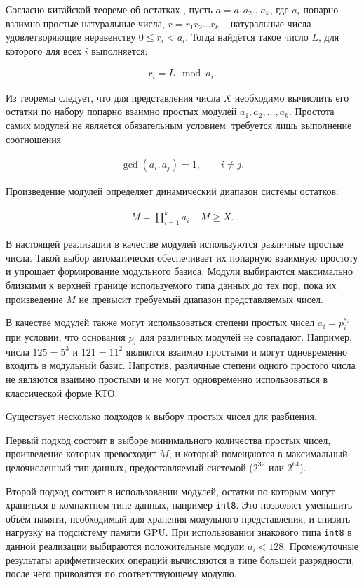 \documentclass{crm-article}
\begin{document}
Согласно китайской теореме об остатках \cite{Cormen2001, Sizyi2008}, пусть $a = a_1 a_2 ... a_k$, где $a_i$ попарно взаимно простые натуральные числа, $r = r_1 r_2 ... r_k$ -- натуральные числа удовлетворяющие неравенству $0 \leq r_i < a_i$. Тогда найдётся такое число $L$, для которого для всех $i$ выполняется:

\begin{gather}
	\label{eq:rem_th}
	r_i=L \mod a_i.
\end{gather}

Из теоремы следует, что для представления числа $X$ необходимо вычислить его остатки по набору попарно взаимно простых модулей $a_1,a_2,\ldots,a_k$. Простота самих модулей не является обязательным условием: требуется лишь выполнение соотношения

\begin{gather}
    \gcd(a_i,a_j)=1,\qquad i\ne j.
\end{gather}

Произведение модулей определяет динамический диапазон системы остатков:

\begin{gather}
	\label{eq:corollary}
	M = \prod\limits_{i=1}^k a_i, ~~~ M \geqslant X.
\end{gather}

В настоящей реализации в качестве модулей используются различные простые числа. Такой выбор автоматически обеспечивает их попарную взаимную простоту и упрощает формирование модульного базиса. Модули выбираются максимально близкими к верхней границе используемого типа данных до тех пор, пока их произведение $M$ не превысит требуемый диапазон представляемых чисел.

В качестве модулей также могут использоваться степени простых чисел $a_i=p_i^{s_i}$ при условии, что основания $p_i$ для различных модулей не совпадают. Например, числа $125=5^3$ и $121=11^2$ являются взаимно простыми и могут одновременно входить в модульный базис. Напротив, различные степени одного простого числа не являются взаимно простыми и не могут одновременно использоваться в классической форме КТО.

Существует несколько подходов к выбору простых чисел для разбиения. 

Первый подход состоит в выборе минимального количества простых чисел, произведение которых превосходит $M$, и который помещаются в максимальный целочисленный тип данных, предоставляемый системой ($2^{32}$ или $2^{64}$). 

Второй подход состоит в использовании модулей, остатки по которым могут храниться в компактном типе данных, например \texttt{int8}. Это позволяет уменьшить объём памяти, необходимый для хранения модульного представления, и снизить нагрузку на подсистему памяти GPU. При использовании знакового типа \texttt{int8} в данной реализации выбираются положительные модули $a_i < 128$. Промежуточные результаты арифметических операций вычисляются в типе большей разрядности, после чего приводятся по соответствующему модулю.
\end{document}
